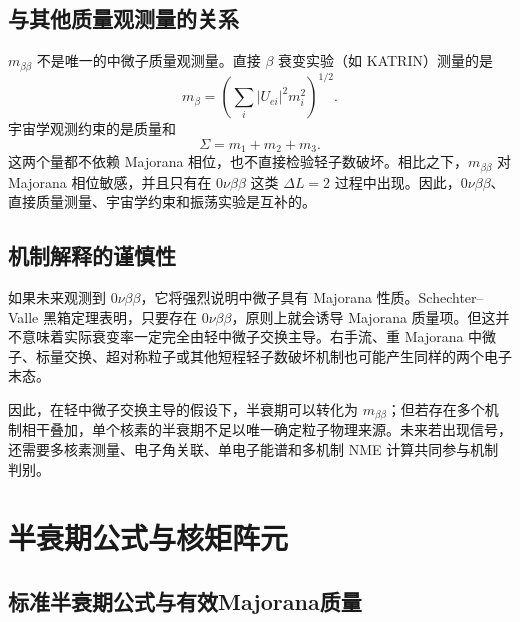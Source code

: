 \documentclass[12pt,a4paper]{ctexart}
\begin{document}
\subsection{与其他质量观测量的关系}

$m_{\beta\beta}$ 不是唯一的中微子质量观测量。直接 $\beta$ 衰变实验（如 KATRIN）测量的是
\begin{equation}
	m_\beta=
	\left(\sum_i |U_{ei}|^2m_i^2\right)^{1/2}.
\end{equation}
宇宙学观测约束的是质量和
\begin{equation}
	\Sigma=m_1+m_2+m_3.
\end{equation}
这两个量都不依赖 Majorana 相位，也不直接检验轻子数破坏。相比之下，$m_{\beta\beta}$ 对 Majorana 相位敏感，并且只有在 $0\nu\beta\beta$ 这类 $\Delta L=2$ 过程中出现。因此，$0\nu\beta\beta$、直接质量测量、宇宙学约束和振荡实验是互补的。

\subsection{机制解释的谨慎性}

如果未来观测到 $0\nu\beta\beta$，它将强烈说明中微子具有 Majorana 性质。Schechter--Valle 黑箱定理表明，只要存在 $0\nu\beta\beta$，原则上就会诱导 Majorana 质量项\cite{SchechterValle1982}。但这并不意味着实际衰变率一定完全由轻中微子交换主导。右手流、重 Majorana 中微子、标量交换、超对称粒子或其他短程轻子数破坏机制也可能产生同样的两个电子末态。

因此，在轻中微子交换主导的假设下，半衰期可以转化为 $m_{\beta\beta}$；但若存在多个机制相干叠加，单个核素的半衰期不足以唯一确定粒子物理来源。未来若出现信号，还需要多核素测量、电子角关联、单电子能谱和多机制 NME 计算共同参与机制判别。

\section{半衰期公式与核矩阵元}

\subsection{标准半衰期公式与有效Majorana质量}
\end{document}
